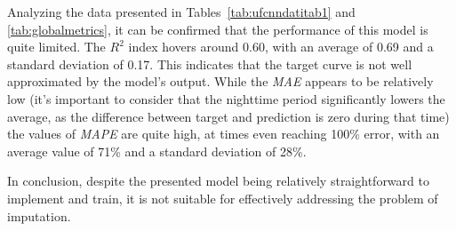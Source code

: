 

Analyzing the data presented in Tables~\ref{tab:ufcnndatitab1}
and \ref{tab:globalmetrics}, it can be confirmed that the performance
of this model is quite limited.
The $R^2$ index hovers around 0.60, with an average of 0.69 and a standard deviation of 0.17. This indicates that the target curve is not well approximated by the model's output.
While the \textit{MAE} appears to be relatively low (it's
important to consider that the nighttime period significantly lowers
the average, as the difference between target and prediction is zero during that time) the values of \textit{MAPE} are quite high, at times even reaching 100\% error, with an average value of 71\% and a standard deviation of 28\%.

In conclusion, despite the presented model being relatively
straightforward to implement and train, it is not suitable for
effectively addressing the problem of imputation.

